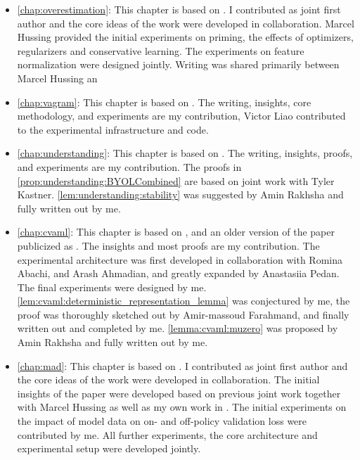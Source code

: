 \begin{itemize}
    \item \autoref{chap:overestimation}: This chapter is based on . I contributed as joint first author and the core ideas of the work were developed in collaboration. Marcel Hussing provided the initial experiments on priming, the effects of optimizers, regularizers and conservative learning. The experiments on feature normalization were designed jointly. Writing was shared primarily between Marcel Hussing an
    \item \autoref{chap:vagram}: This chapter is based on . The writing, insights, core methodology, and experiments are my contribution, Victor Liao contributed to the experimental infrastructure and code.
    \item \autoref{chap:understanding}: This chapter is based on . The writing, insights, proofs, and experiments are my contribution. The proofs in \autoref{prop:understanding:BYOLCombined} are based on joint work with Tyler Kastner. \autoref{lem:understanding:stability} was suggested by Amin Rakhsha and fully written out by me.
    \item \autoref{chap:cvaml}: This chapter is based on , and an older version of the paper publicized as . The insights and most proofs are my contribution. The experimental architecture was first developed in collaboration with Romina Abachi, and Arash Ahmadian, and greatly expanded by Anastasiia Pedan. The final experiments were designed by me. \autoref{lem:cvaml:deterministic_representation_lemma} was conjectured by me, the proof was thoroughly sketched out by Amir-massoud Farahmand, and finally written out and completed by me. \autoref{lemma:cvaml:muzero} was proposed by Amin Rakhsha and fully written out by me.
    \item \autoref{chap:mad}: This chapter is based on . I contributed as joint first author and the core ideas of the work were developed in collaboration. The initial insights of the paper were developed based on previous joint work \cite{hussing2024dissecting} together with Marcel Hussing as well as my own work in \textcite{voelcker2023lambda}. The initial experiments on the impact of model data on on- and off-policy validation loss were contributed by me. All further experiments, the core architecture and experimental setup were developed jointly.
\end{itemize}

